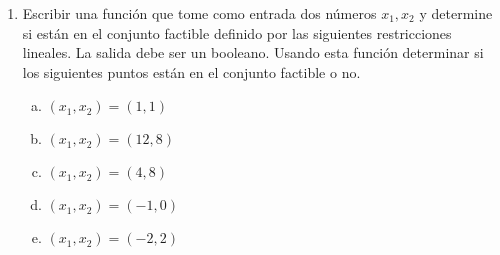 \documentclass[12pt]{article}
\begin{document}
\begin{center}
\begin{enumerate}
                \item  Escribir una función que tome como entrada dos números $x_{1},x_{2}$ y determine si están en el conjunto factible definido por las siguientes restricciones lineales.
                La salida debe ser un booleano.
                Usando esta función determinar si los siguientes puntos están en el conjunto factible o no.
                \begin{enumerate}[a)]
                    \item $(x_{1},x_{2}) = (1,1)$
                    \item $(x_{1},x_{2}) = (12,8)$
                    \item $(x_{1},x_{2}) = (4,8)$
                    \item $(x_{1},x_{2}) = (-1,0)$
                    \item $(x_{1},x_{2}) = (-2,2)$
                \end{enumerate}
                    

\end{enumerate}
\end{center}
\end{document}
